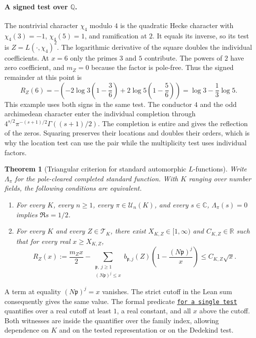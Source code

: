 \documentclass[11pt]{amsart}
\newtheorem{theorem}{Theorem}[section]
\theoremstyle{definition}
\theoremstyle{remark}
\numberwithin{equation}{section}
\newcommand{\repositoryurl}{https://github.com/kimihiro64/Robin1984}
\newcommand{\proofrevision}{b359826e62c50b6cef55db4b2fcab793232498cc}
\newcommand{\codelink}[2]{%
  \href{\repositoryurl/blob/\proofrevision/#1}{\texttt{#2}}}
\begin{document}
\paragraph{A signed test over \(\mathbb Q\).}
The nontrivial character \(\chi_4\) modulo \(4\) is the quadratic
Hecke character with \(\chi_4(3)=-1\), \(\chi_4(5)=1\), and
ramification at \(2\). It equals its inverse, so its test is
\(Z=L(\cdot,\chi_4)^2\). The logarithmic derivative of the
square doubles the individual coefficients. At \(x=6\)
only the primes \(3\) and \(5\) contribute. The powers of \(2\)
have zero coefficient, and \(m_Z=0\) because the factor is
pole-free. Thus the signed remainder at this point is
\[
 R_Z(6)=-\left(-2\log 3\left(1-\frac{3}{6}\right)
                   +2\log 5\left(1-\frac{5}{6}\right)\right)
        =\log 3-\frac13\log 5 .
\]
This example uses both signs in the same test. The conductor
\(4\) and the odd archimedean character enter the individual
completion through \(4^{s/2}\pi^{-(s+1)/2}\Gamma((s+1)/2)\).
The completion is entire and gives the reflection of the zeros.
Squaring preserves their locations and doubles their orders,
which is why the location test can use the pair while the
multiplicity test uses individual factors.

\begin{theorem}[Triangular criterion for standard automorphic \(L\)-functions]\label{thm:grand-triangular}
Write \(\Lambda_\pi\) for the pole-cleared completed standard
function. With \(K\) ranging over number fields, the following
conditions are equivalent.
\begin{enumerate}[label=\textup{(\roman*)}]
\item For every \(K\), every \(n\geq1\), every
\(\pi\in\mathcal U_n(K)\), and every \(s\in\mathbb C\),
\(\Lambda_\pi(s)=0\) implies \(\Re s=1/2\).
\item For every \(K\) and every \(Z\in\mathcal T_K\), there exist
\(X_{K,Z}\in[1,\infty)\) and \(C_{K,Z}\in\mathbb R\) such that
for every real \(x\geq X_{K,Z}\),
\begin{equation}\label{eq:grand-rh-prime-power}
 R_Z(x):=\frac{m_Zx}{2}
  -\sum_{\substack{\mathfrak p,\ j\geq1\\(N\mathfrak p)^j\leq x}}
    b_{\mathfrak p,j}(Z)\left(1-\frac{(N\mathfrak p)^j}{x}\right)
   \leq C_{K,Z}\sqrt{x}.
\end{equation}
\end{enumerate}
\end{theorem}

A term at equality \((N\mathfrak p)^j=x\) vanishes. The strict
cutoff in the Lean sum consequently gives the same value. The
formal predicate \codelink{Challenge.lean\#L134}{\textup{for a single test}}
quantifies over a real cutoff at least \(1\), a real constant,
and all \(x\) above the cutoff. Both witnesses are inside the
quantifier over the family index, allowing dependence on \(K\)
and on the tested representation or on the Dedekind test.
\end{document}
